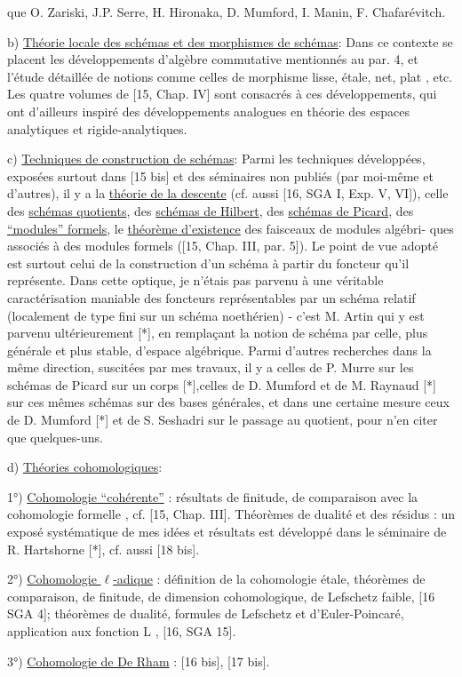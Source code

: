 
que O. Zariski, J.P. Serre, H. Hironaka, D. Mumford, I. Manin, F. Chafarévitch.

b) \uline{Théorie locale des schémas et des morphismes de schémas}: Dans ce contexte
se placent les développements d'algèbre commutative mentionnés au par. 4, et
l'étude détaillée de notions comme celles de morphisme lisse, étale, net, plat ,
etc. Les quatre volumes de [15, Chap. IV] sont consacrés à ces développements,
qui ont d'ailleurs inspiré des développements analogues en théorie des espaces
analytiques et rigide-analytiques.

c) \uline{Techniques de construction de schémas}: Parmi les techniques développées,
exposées surtout dans [15 bis] et des séminaires non publiés (par moi-même et
d'autres), il y a la \uline{théorie de la descente} (cf. aussi [16, SGA I, Exp. V, VI]),
celle des \uline{schémas quotients}, des \uline{schémas de Hilbert}, des \uline{schémas de Picard},
des \uline{``modules'' formels}, le \uline{théorème d'existence} des faisceaux de modules algébri-%
ques associés à des modules formels ([15, Chap. III, par. 5]). Le point de vue
adopté est surtout celui de la construction d'un schéma à partir du foncteur
qu'il représente. Dans cette optique, je n'étais pas parvenu à une véritable
caractérisation maniable des foncteurs représentables par un schéma relatif
(localement de type fini sur un schéma noethérien) - c'est M. Artin qui y est
parvenu ultérieurement [*], en remplaçant la notion de schéma par celle, plus
générale et plus stable, d'espace algébrique. Parmi d'autres recherches dans
la même direction, suscitées par mes travaux, il y a celles de P. Murre sur les
schémas de Picard sur un corps [*],celles de D. Mumford et de M. Raynaud [*]
sur ces mêmes schémas sur des bases générales, et dans une certaine mesure
ceux de D. Mumford [*] et de S. Seshadri sur le passage au quotient, pour n'en
citer que quelques-uns.

d) \uline{Théories cohomologiques}:

1°) \uline{Cohomologie ``cohérente''} : résultats de finitude, de comparaison avec la
cohomologie formelle , cf. [15, Chap. III]. Théorèmes de dualité et des résidus :
un exposé systématique de mes idées et résultats est développé dans le séminaire
de R. Hartshorne [*], cf. aussi [18 bis].

2°) \uline{Cohomologie $\ell$-adique} : définition de la cohomologie étale, théorèmes de
comparaison, de finitude, de dimension cohomologique, de Lefschetz faible,
[16 SGA 4]; théorèmes de dualité, formules de Lefschetz et d'Euler-Poincaré,
application aux fonction L , [16, SGA 15].

3°) \uline{Cohomologie de De Rham} : [16 bis], [17 bis].

